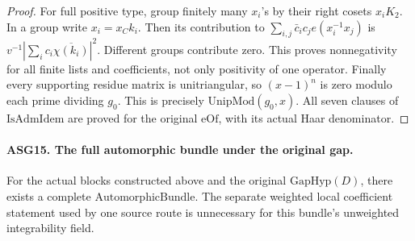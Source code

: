 \documentclass[11pt,a4paper]{article}
\numberwithin{equation}{section}
\theoremstyle{remark}\newtheorem{remark}[theorem]{Remark}
\begin{document}
\begin{proof}
For full positive type, group finitely many \(x_i\)'s by their
right cosets \(x_iK_2\).  In a group write \(x_i=x_C k_i\).
Then its contribution to
\(\sum_{i,j}\bar c_i c_j e(x_i^{-1}x_j)\) is
\(v^{-1}|\sum_i c_i\overline{\chi(k_i)}|^2\).
Different groups contribute zero.  This proves nonnegativity for all
finite lists and coefficients, not only positivity of one operator.
Finally every supporting residue matrix is unitriangular, so
\((x-1)^n\) is zero modulo each prime dividing \(g_0\).
This is precisely \(\mathrm{UnipMod}(g_0,x)\).
All seven clauses of \(\mathrm{IsAdmIdem}\) are proved for the
original \(\mathrm{eOf}\), with its actual Haar denominator.
\end{proof}

\paragraph{ASG15. The full automorphic bundle under the original gap.}
\label{claim:ASG15}
For the actual blocks constructed above and the original
\(\mathrm{GapHyp}(D)\), there exists a complete
\(\mathrm{AutomorphicBundle}\).  The separate weighted local
coefficient statement used by one source route is unnecessary for
this bundle's unweighted integrability field.
\end{document}
